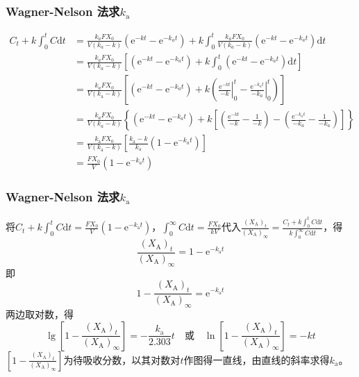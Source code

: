 \documentclass[dvipsnames, svgnames, x11names]{beamer}
\begin{document}
\begin{frame}
    \frametitle{Wagner-Nelson 法求$k_\mathrm{a}$}
    \[
        \begin{aligned}
            C_{t}+k\int_{0}^{t}C\mathrm{d}t& =\frac{k_{a}FX_{0}}{V(k_{a}-k)}(\mathrm{e}^{-kt}-\mathrm{e}^{-k_{a}t})+k\int_{0}^{t}\frac{k_{a}FX_{0}}{V(k_{a}-k)}(\mathrm{e}^{-kt}-\mathrm{e}^{-k_{a}t})\mathrm{d}t  \\
            &=\frac{k_{a}FX_{0}}{V(k_{a}-k)}[(\mathrm{e}^{-kt}-\mathrm{e}^{-k_{a}t})+k\int_{0}^{t}(\mathrm{e}^{-kt}-\mathrm{e}^{-k_{a}t})\mathrm{d}t] \\
            &=\frac{k_{a}FX_{0}}{V(k_{\mathrm{a}}-k)}\left[(\mathrm{e}^{-kt}-\mathrm{e}^{-k_{a}t})+k\left(\left.\frac{\mathrm{e}^{-kt}}{-k}\right|_{0}^{t}-\left.\frac{\mathrm{e}^{-k_{a}t}}{-k_{a}}\right|_{0}^{t}\right)\right] \\            
            &=\frac{k_{a}FX_{0}}{V(k_{a}-k)}\left\{\left(\mathrm{e}^{-kt}-\mathrm{e}^{-k_{a}t}\right)+k\left[(\frac{\mathrm{e}^{-kt}}{-k}-\frac{1}{-k})-(\frac{\mathrm{e}^{-k_{a}t}}{-k_{a}}-\frac{1}{-k_{a}})\right]\right\} \\
            &=\frac{k_{\mathrm{a}}FX_{0}}{V(k_{\mathrm{a}}-k)}\left[\frac{k_{\mathrm{a}}-k}{k_{\mathrm{a}}}(1-\mathrm{e}^{-k_{a}t})\right] \\
            &=\frac{FX_0}V(1-\mathrm{e}^{-k_at})
            \end{aligned}
    \]
\end{frame}


\begin{frame}
    \frametitle{Wagner-Nelson 法求$k_\mathrm{a}$}
    将$C_{t}+k\int_{0}^{t}C\mathrm{d}t=\frac{FX_0}V(1-\mathrm{e}^{-k_\mathrm{a}t})$，$\int_{0}^{\infty}C\mathrm{d}t=\frac{FX_{0}}{kV}$代入$\frac{(X_{\mathrm{A}})_{t}}{(X_{\mathrm{A}})_{\infty}}=\frac{C_{t}+k\int_{0}^{t}C\mathrm{d}t}{k\int_{0}^{\infty}C\mathrm{d}t}$，得
    \[
        \frac{(X_{\mathrm{A}})_{t}}{(X_{\mathrm{A}})_{\infty}}=1-\mathrm{e}^{-k_\mathrm{a}t}
    \]
    即
    \[
        1-\frac{(X_{\mathrm{A}})_{t}}{(X_{\mathrm{A}})_{\infty}}=\mathrm{e}^{-k_\mathrm{a}t}
    \]
    两边取对数，得
    \[
        \lg\left[1-\frac{\left(X_{\mathrm{A}}\right)_t}{\left(X_{\mathrm{A}}\right)_{\mathrm{\infty}}}\right]=-\frac{k_{\mathrm{a}}}{2.303}t \quad \text{或} \quad \ln\left[1-\frac{\left(X_{\mathrm{A}}\right)_t}{\left(X_{\mathrm{A}}\right)_{\mathrm{\infty}}}\right]=-kt
    \]
    $\left[1-\frac{\left(X_{\mathrm{A}}\right)_t}{\left(X_{\mathrm{A}}\right)_{\mathrm{\infty}}}\right]$为待吸收分数，以其对数对$t$作图得一直线，由直线的斜率求得$k_\mathrm{a}$。
\end{frame}
\end{document}
